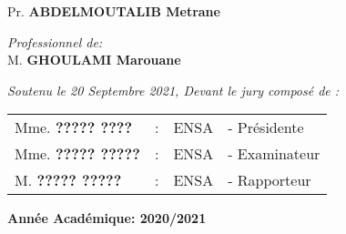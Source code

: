 \begin{titlepage}
\begin{minipage}{0.4\textwidth}
\begin{flushleft}
    Pr. \textbf{\textsc{ABDELMOUTALIB} Metrane}\\
 \end{flushleft}
\end{minipage}\hfill
\noindent
\begin{minipage}{0.4\textwidth}
 \begin{flushright}
 	\centering
    \emph{Professionnel de:} \\[0.5cm]
     M. \textbf{\textsc{GHOULAMI} Marouane}\\
  \end{flushright}
\end{minipage}
\vfill
\centering
{\large \textit{Soutenu le 20 Septembre 2021, Devant le jury composé de : }}\\[0.5cm]
\begin{tabular}{llll}
\large Mme. \textbf{????? \textsc{????}}     & : & \large ENSA & \large - Présidente \\[0.1cm]
\large Mme. \textbf{????? \textsc{?????}}    & : & \large ENSA & \large - Examinateur \\[0.1cm]
\large M. \textbf{????? \textsc{?????}}         & : & \large ENSA & \large - Rapporteur
\end{tabular}
\vfill
{\large \textbf{Année Académique: 2020/2021}}

\end{titlepage}
